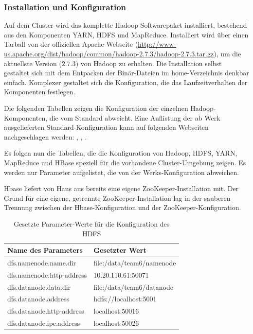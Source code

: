 \subsubsection{Installation und Konfiguration}
Auf dem Cluster wird das komplette Hadoop-Softwarepaket installiert, bestehend aus den
Komponenten \ac{YARN}, \ac{HDFS} und MapReduce. Installiert wird über einen Tarball von der offiziellen
Apache-Webseite (\url{http://www-us.apache.org/dist/hadoop/common/hadoop-2.7.3/hadoop-2.7.3.tar.gz}), um die aktuellste Version ($2.7.3$) von Hadoop zu erhalten. Die Installation selbst gestaltet sich mit dem Entpacken der Binär-Dateien im home-Verzeichnis 
denkbar einfach. Komplexer gestaltet sich die Konfiguration, die das Laufzeitverhalten der Komponenten festlegen.

Die folgenden Tabellen zeigen die Konfiguration der einzelnen Hadoop-Komponenten, die vom Standard abweicht.
Eine Auflistung der ab Werk ausgelieferten Standard-Konfiguration kann auf folgenden Webseiten nachgeschlagen werden:
\cite{hdfsDefault}, \cite{yarnDefault}, \cite{mapreduceDefault} \cite{hbaseConfig}.

Es folgen nun die Tabellen, die die Konfiguration von Hadoop, HDFS, YARN, MapReduce und HBase 
speziell für die vorhandene Cluster-Umgebung zeigen. Es werden  nur Parameter aufgelistet, 
die von der Werks-Konfiguration abweichen.

Hbase liefert von Haus aus bereits eine eigene ZooKeeper-Installation mit. Der Grund für eine eigene, getrennte ZooKeeper-Installation lag in der sauberen Trennung zwischen der Hbase-Konfiguration und der ZooKeeper-Konfiguration. 

\begin{table}
	\begin{tabularx}{\textwidth}{| X | X |} \hline
		Name des Parameters & Gesetzter Wert \\ \hline
		dfs.namenode.name.dir & file:/data/team6/namenode \\ \hline
		dfs.namenode.http-address & 10.20.110.61:50071  \\ \hline
		dfs.datanode.data.dir & file:/data/team6/datanode \\ \hline
		dfs.datanode.address & hdfs://localhost:5001 \\ \hline
		dfs.datanode.http-address & localhost:50016 \\ \hline
		dfs.datanode.ipc.address & localhost:50026 \\ \hline
	\end{tabularx}
	\caption{Gesetzte Parameter-Werte für die Konfiguration des HDFS}
	\label{config:hdfsValues}
\end{table}

